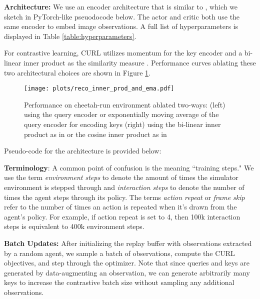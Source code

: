 \documentclass{article}
\begin{document}
{\textbf{Architecture:}} We use an encoder architecture that is similar to \cite{yarats2019improving}, which we sketch in PyTorch-like pseuodocode below. The actor and critic both use the same encoder to embed image observations. A full list of hyperparameters is displayed in Table \ref{table:hyperparameters}.

For contrastive learning, CURL utilizes momentum for the key encoder \cite{kaiming2019moco} and a bi-linear inner product as the similarity measure \cite{oord2018representation}. Performance curves ablating these two architectural choices are shown in Figure \ref{fig:method_ablations}.

\begin{figure}[H]
\vskip 0.2in
\begin{center}
\centerline{\texttt{[image: plots/reco\_inner\_prod\_and\_ema.pdf]}}
\caption{Performance on cheetah-run environment ablated two-ways: (left) using the query encoder or exponentially moving average of the query encoder for encoding keys (right) using the bi-linear inner product as in \cite{oord2018representation} or the cosine inner product as in \citet{kaiming2019moco,chen2020simclr}}
\label{fig:method_ablations}
\end{center}
\vskip -0.2in
\end{figure}

Pseudo-code for the architecture is provided below:



{\textbf{Terminology}:} A common point of confusion is the meaning  ``training steps." We use the term \textit{environment steps} to denote the amount of times the simulator environment is stepped through and \textit{interaction steps} to denote the number of times the agent steps through its policy. The terms \textit{action repeat} or \textit{frame skip} refer to the number of times an action is repeated when it's drawn from the agent's policy. For example, if action repeat is set to 4, then 100k interaction steps is equivalent to 400k environment steps.


{\textbf{Batch Updates:}} After initializing the replay buffer with observations extracted by a random agent, we sample a batch of observations, compute the CURL objectives, and step through the optimizer. Note that since queries and keys are generated by data-augmenting an observation, we can generate arbitrarily many keys to increase the contrastive batch size without sampling any additional observations.
\end{document}
